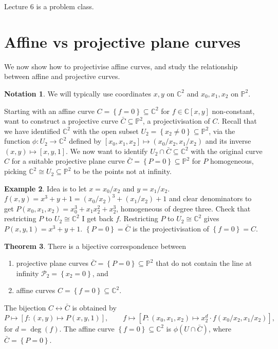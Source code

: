 \documentclass{article}
\newcommand{\C}{\mathbb{C}}
\renewcommand{\P}{\mathbb{P}}
\newcommand{\rb}[1]{\left( #1 \right)}
\renewcommand{\sb}[1]{\left[ #1 \right]}
\newcommand{\cb}[1]{\left\{ #1 \right\}}
\theoremstyle{definition}\newtheorem{definition}{Definition}[section]
\theoremstyle{definition}\newtheorem{notation}[definition]{Notation}
\theoremstyle{definition}\newtheorem{remark}[definition]{Remark}
\theoremstyle{definition}\newtheorem{example}[definition]{Example}
\theoremstyle{definition}\newtheorem{fact}{Fact}
\theoremstyle{definition}\newtheorem{exercise}{Exercise}
\newtheorem{theorem}[definition]{Theorem}
\begin{document}

Lecture 6 is a problem class.

\section{Affine vs projective plane curves}

We now show how to projectivise affine curves, and study the relationship between affine and projective curves.

\begin{notation}
We will typically use coordinates $ x, y $ on $ \C^2 $ and $ x_0, x_1, x_2 $ on $ \P^2 $.
\end{notation}

Starting with an affine curve $ C = \cb{f = 0} \subseteq \C^2 $ for $ f \in \C\sb{x, y} $ non-constant, want to construct a projective curve $ \bar{C} \subseteq \P^2 $, a projectivisation of $ C $. Recall that we have identified $ \C^2 $ with the open subset $ U_2 = \cb{x_2 \ne 0} \subseteq \P^2 $, via the function $ \phi : U_2 \to \C^2 $ defined by $ \sb{x_0, x_1, x_2} \mapsto \rb{x_0 / x_2, x_1 / x_2} $ and its inverse $ \rb{x, y} \mapsto \sb{x, y, 1} $. We now want to identify $ U_2 \cap \bar{C} \subseteq \C^2 $ with the original curve $ C $ for a suitable projective plane curve $ \bar{C} = \cb{P = 0} \subseteq \P^2 $ for $ P $ homogeneous, picking $ \C^2 \cong U_2 \subseteq \P^2 $ to be the points not at infinity.

\begin{example}
Idea is to let $ x = x_0 / x_2 $ and $ y = x_1 / x_2 $. $ f\rb{x, y} = x^3 + y + 1 = \rb{x_0 / x_2}^3 + \rb{x_1 / x_2} + 1 $ and clear denominators to get $ P\rb{x_0, x_1, x_2} = x_0^3 + x_1x_2^2 + x_2^3 $, homogeneous of degree three. Check that restricting $ P $ to $ U_2 \cong \C^2 $ I get back $ f $. Restricting $ P $ to $ U_2 \cong \C^2 $ gives $ P\rb{x, y, 1} = x^3 + y + 1 $. $ \cb{P = 0} = \bar{C} $ is the projectivisation of $ \cb{f = 0} = C $.
\end{example}

\begin{theorem}
\label{thm:5.2}
There is a bijective correspondence between
\begin{enumerate}
\item projective plane curves $ \bar{C} = \cb{P = 0} \subseteq \P^2 $ that do not contain the line at infinity $ \mathcal{P}_2 = \cb{x_2 = 0} $, and
\item affine curves $ C = \cb{f = 0} \subseteq \C^2 $.
\end{enumerate}
The bijection $ C \leftrightarrow \bar{C} $ is obtained by
$$ P \mapsto \sb{f : \rb{x, y} \mapsto P\rb{x, y, 1}}, \qquad f \mapsto \sb{P : \rb{x_0, x_1, x_2} \mapsto x_2^d \cdot f\rb{x_0 / x_2, x_1 / x_2}}, $$
for $ d = \deg\rb{f} $. The affine curve $ \cb{f = 0} \subseteq \C^2 $ is $ \phi\rb{U \cap \bar{C}} $, where $ \bar{C} = \cb{P = 0} $.
\end{theorem}
\end{document}
